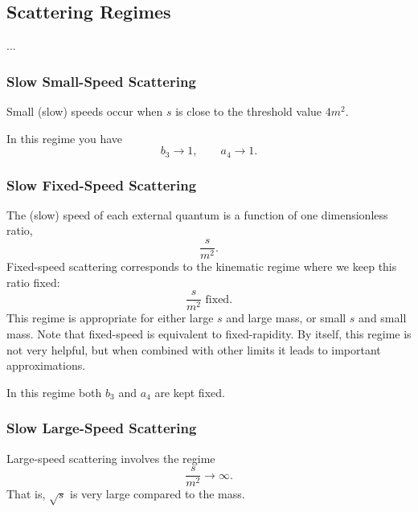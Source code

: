 \subsection{Scattering Regimes}
...
\subsubsection{Slow Small-Speed Scattering}
Small (slow) speeds occur when $s$ is close to the threshold value $4 m^{2}$.

In this regime you have
\begin{equation}
	b_{3} \rightarrow 1, \qquad a_{4} \rightarrow 1.
\end{equation}
\subsubsection{Slow Fixed-Speed Scattering}
The (slow) speed of each external quantum is a function of one dimensionless ratio,
\begin{equation}
	\frac{s}{m^{2}}.
\end{equation}
Fixed-speed scattering corresponds to the kinematic regime where we keep this ratio fixed:
\begin{equation}
	\frac{s}{m^{2}} \text{ fixed}.
\end{equation}
This regime is appropriate for either large $s$ and large mass, or small $s$ and small mass. Note that fixed-speed is equivalent to fixed-rapidity. By itself, this regime is not very helpful, but when combined with other limits it leads to important approximations.

In this regime both $b_{3}$ and $a_{4}$ are kept fixed.
\subsubsection{Slow Large-Speed Scattering}
Large-speed scattering involves the regime
\begin{equation}
	\frac{s}{m^{2}} \rightarrow \infty.
\end{equation}
That is, $\sqrt{s}$ is very large compared to the mass.

